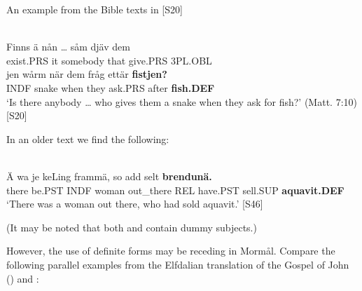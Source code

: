 \z

An example from the Bible texts in [S20]\textstyleLinguisticExample{:}

\ea \label{} 
\\
\gll Finns  ä  nån  …  såm  djäv  dem\\
exist.PRS  it  somebody    that  give.PRS  3PL.OBL\\
\gll jen  wårm  när  dem  fråg  ettär  \textbf{fistjen?}\\
INDF  snake  when  they  ask.PRS  after  \textbf{fish.DEF}\\
\glt ‘Is there anybody … who gives them a snake when they ask for fish?’ (Matt. 7:10) [S20]

\z

In an older text we find the following:

\ea \label{} 
\\
\gll Ä  wa  je  keLing  frammä,  so  add  selt  \textbf{brendunä.}\\
there  be.PST  INDF  woman  out\_there  REL  have.PST  sell.SUP  \textbf{aquavit.DEF}\\
\glt ‘There was a woman out there, who had sold aquavit.’ [S46]

\z

(It may be noted that both  and  contain dummy subjects.)

However, the use of definite forms may be receding in Mormål. Compare the following parallel examples from the Elfdalian translation of the Gospel of John () and :

